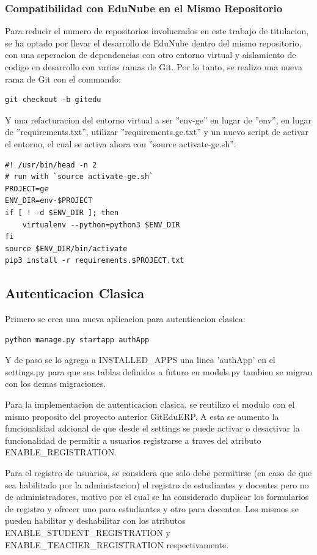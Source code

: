 \subsubsection{Compatibilidad con EduNube en el Mismo Repositorio}
Para reducir el numero de repositorios involucrados en este trabajo de titulacion, se ha optado por llevar el desarrollo de EduNube dentro del mismo repositorio, con una seperacion de dependencias con otro entorno virtual y aislamiento de codigo en desarrollo con varias ramas de Git. Por lo tanto, se realizo una nueva rama de Git con el commando:
\begin{lstlisting}
git checkout -b gitedu
\end{lstlisting}

Y una refacturacion del entorno virtual a ser ''env-ge'' en lugar de ''env'', en lugar de ''requirements.txt'', utilizar ''requirements.ge.txt'' y un nuevo script de activar el entorno, el cual se activa ahora con ''source activate-ge.sh'':
\begin{lstlisting}
#! /usr/bin/head -n 2 
# run with `source activate-ge.sh`
PROJECT=ge
ENV_DIR=env-$PROJECT
if [ ! -d $ENV_DIR ]; then
	virtualenv --python=python3 $ENV_DIR
fi
source $ENV_DIR/bin/activate
pip3 install -r requirements.$PROJECT.txt
\end{lstlisting}

\subsection{Autenticacion Clasica}

Primero se crea una nueva aplicacion para autenticacion clasica:
\begin{lstlisting}
python manage.py startapp authApp
\end{lstlisting}

Y de paso se lo agrega a INSTALLED\_APPS una linea 'authApp' en el settings.py para que sus tablas definidos a futuro en models.py tambien se migran con los demas migraciones.

Para la implementacion de autenticacion clasica, se reutilizo el modulo con el mismo proposito del proyecto anterior GitEduERP. A esta se aumento la funcionalidad adcional de que desde el settings se puede activar o desactivar la funcionalidad de permitir a usuarios registrarse a traves del atributo ENABLE\_REGISTRATION. 

Para el registro de usuarios, se considera que solo debe permitirse (en caso de que sea habilitado por la administacion) el registro de estudiantes y docentes pero no de administradores, motivo por el cual se ha considerado duplicar los formularios de registro y ofrecer uno para estudiantes y otro para docentes. Los mismos se pueden habilitar y deshabilitar con los atributos ENABLE\_STUDENT\_REGISTRATION y ENABLE\_TEACHER\_REGISTRATION respectivamente.


